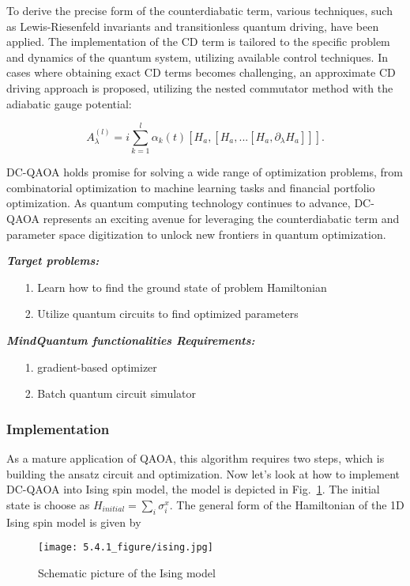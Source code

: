 To derive the precise form of the counterdiabatic term, various techniques, such as Lewis-Riesenfeld invariants and transitionless quantum driving, have been applied. The implementation of the CD term is tailored to the specific problem and dynamics of the quantum system, utilizing available control techniques. In cases where obtaining exact CD terms becomes challenging, an approximate CD driving approach is proposed, utilizing the nested commutator method \cite{Chandarana_2023} with the adiabatic gauge potential:

\begin{equation}
    A_{\lambda}^{(l)} = i\sum_{k=1}^{l}\alpha_{k}(t)[H_{a},[H_{a},...[H_{a}, \partial_{\lambda}H_{a}]]].
\end{equation}

DC-QAOA holds promise for solving a wide range of optimization problems, from combinatorial optimization to machine learning tasks and financial portfolio optimization. As quantum computing technology continues to advance, DC-QAOA represents an exciting avenue for leveraging the counterdiabatic term and parameter space digitization to unlock new frontiers in quantum optimization.

\textbf{\textit{Target problems:}}
\begin{itemize}
    \item[1.] Learn how to find the ground state of problem Hamiltonian
    \item[2.] Utilize quantum circuits to find optimized parameters
\end{itemize}
\textbf{\textit{MindQuantum functionalities Requirements:}}
\begin{itemize}
    \item[1.] gradient-based optimizer
    \item[2.] Batch quantum circuit simulator

\end{itemize}

\subsubsection{Implementation}
As a mature application of QAOA, this algorithm requires two steps, which is building the ansatz circuit and optimization. Now let's look at how to implement DC-QAOA into Ising spin model, the model is depicted in Fig.~\ref{fig:ising}. The initial state is choose as $H_{initial} = \sum_{i}\sigma_{i}^{x}$. The general form of the Hamiltonian of the 1D Ising spin model is given by
\begin{figure}
    \centering
    \texttt{[image: 5.4.1\_figure/ising.jpg]}
    \caption{Schematic picture of the Ising model}
    \label{fig:ising}
\end{figure}

